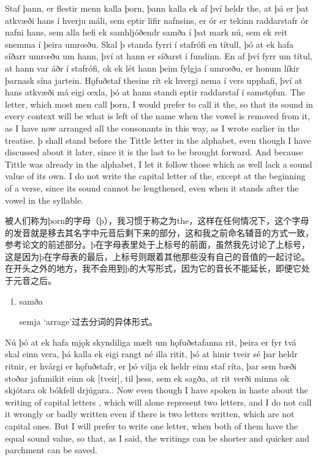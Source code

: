 \begin{paracol}{2}
    Staf þann, er flestir menn kalla þorn, þann kalla ek af því heldr the, at þá er þat atkvæði hans í hverju máli, sem eptir lifir nafnsins, er ór er tekinn raddarstafr ór nafni hans, sem alla hefi ek samhljóðendr samða í þat mark nú, sem ek reit snemma í þeira umrœðu. Skal þ standa fyrri í stafrófi en títull, þó at ek hafa síðarr umrœðu um hann, því at hann er síðarst í fundinn. En af því fyrr um títul, at hann var áðr í stafrófi, ok ek lét hann þeim fylgja í umrœðu, er honum líkir þarnask sína jartein. Hǫfuðstaf thesins rít ek hvergi nema í vers upphafi, því at hans atkvæði má eigi œxla, þó at hann standi eptir raddarstaf í samstǫfun.
    \switchcolumn
    The letter, which most men call þorn, I would prefer to call it the, so that its sound in every context will be what is left of the name when the vowel is removed from it, as I have now arranged all the consonants in this way, as I wrote earlier in the treatise. þ shall stand before the Tittle letter in the alphabet, even though I have discussed about it later, since it is the last to be brought forward. And because Tittle was already in the alphabet, I let it follow those which as well lack a sound value of its own. I do not write the capital letter of the, except at the beginning of a verse, since its sound cannot be lengthened, even when it stands after the vowel in the syllable.
\end{paracol}
\begin{translation*}{}
    被人们称为þorn的字母（þ），我习惯于称之为the，这样在任何情况下，这个字母的发音就是移去其名字中元音后剩下来的部分，这和我之前命名辅音的方式一致，参考论文的前述部分。þ在字母表里处于上标号的前面，虽然我先讨论了上标号，这是因为þ在字母表的最后，上标号则跟着其他那些没有自己的音值的一起讨论。在开头之外的地方，我不会用到þ的大写形式，因为它的音长不能延长，即便它处于元音之后。
\end{translation*}
\begin{grammar*}{}
    \begin{enumerate}[leftmargin=*]
        \item samða

              semja `arrage'过去分词的异体形式。
    \end{enumerate}
\end{grammar*}
\begin{paracol}{2}
    Nú þó at ek hafa mjǫk skyndiliga mælt um hǫfuðstafanna rit, þeira er fyr tvá skal einn vera, þá kalla ek eigi rangt né illa ritit, þó at hinir tveir sé þar heldr ritnir, er hvárgi er hǫfuðstafr, er þó vilja ek heldr einn staf ríta, þar sem bæði stoðar jafnmikit einn ok [tveir], til þess, sem ek sagða, at rit verði minna ok skjótara ok bókfell drjúgara..
    \switchcolumn
    Now even though I have spoken in haste about the writing of capital letters , which will alone represent two letters, and I do not call it wrongly or badly written even if there is two letters written, which are not capital ones. But I will prefer to write one letter, when both of them have the equal sound value, so that, as I said, the writings can be shorter and quicker and parchment can be saved.
\end{paracol}
